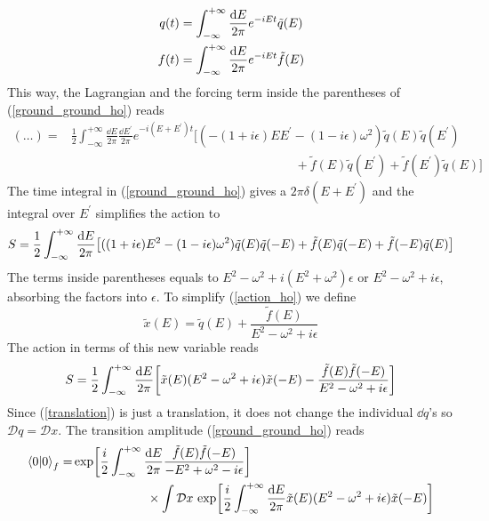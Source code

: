 \begin{equation}
    \begin{aligned}
           q(t)&=\int_{-\infty}^{+\infty}\frac{\dd E}{2\pi}e^{-iEt}\Tilde{q}(E)\\
           f(t)&=\int_{-\infty}^{+\infty}\frac{\dd E}{2\pi}e^{-iEt}\Tilde{f}(E)
    \end{aligned}
\end{equation}
This way, the Lagrangian and the forcing term inside the parentheses of (\ref{ground_ground_ho}) reads
\begin{align}
    (\dots)=&\frac{1}{2}\int_{-\infty}^{+\infty}\frac{\dd E}{2\pi}\frac{\dd E^{\prime}}{2\pi}e^{-i(E+E^{\prime})t}[(-(1+i\epsilon)EE^{\prime}-(1-i\epsilon)\omega^2)\tilde{q}(E)\tilde{q}(E^\prime)\nonumber\\
    &\qquad\qquad\qquad\qquad\qquad\qquad\qquad\qquad\qquad+\tilde{f}(E)\tilde{q}(E^\prime)+\tilde{f}(E^\prime)\tilde{q}(E)]
\end{align}
The time integral in (\ref{ground_ground_ho}) gives a $2\pi\delta(E+E^\prime)$ and the integral over $E^\prime$ simplifies the action to
\begin{equation}
    S=\frac{1}{2}\int_{-\infty}^{+\infty}\frac{\dd E}{2\pi}\qty[((1+i\epsilon)E^2-(1-i\epsilon)\omega^2)\tilde{q}(E)\tilde{q}(-E)+\tilde{f}(E)\tilde{q}(-E)+\tilde{f}(-E)\tilde{q}(E)]
    \label{action_ho}
\end{equation}
The terms inside parentheses equals to $E^2-\omega^2+i(E^2+\omega^2)\epsilon$ or $E^2-\omega^2+i\epsilon$, absorbing the factors into $\epsilon$. To simplify (\ref{action_ho}) we define
\begin{equation}
    \tilde{x}(E)=\tilde{q}(E)+\frac{\tilde{f}(E)}{E^2-\omega^2+i\epsilon}
    \label{translation}
\end{equation}
The action in terms of this new variable reads
\begin{equation}
    S=\frac{1}{2}\int_{-\infty}^{+\infty}\frac{\dd E}{2\pi}\qty[\tilde{x}(E)(E^2-\omega^2+i\epsilon)\tilde{x}(-E)-\frac{\tilde{f}(E)\tilde{f}(-E)}{E^2-\omega^2+i\epsilon}]
\end{equation}
Since (\ref{translation}) is just a translation, it does not change the individual $\dd q$'s so $\mathcal{D}q=\mathcal{D}x$. The transition amplitude (\ref{ground_ground_ho}) reads
\begin{equation}
\begin{aligned}
    \braket{0}_f=&\exp[\frac{i}{2}\int_{-\infty}^{+\infty}\frac{\dd E}{2\pi}\frac{\tilde{f}(E)\tilde{f}(-E)}{-E^2+\omega^2-i\epsilon}]\\&\qquad\qquad\qquad\times\int\mathcal{D}x\,\exp[\frac{i}{2}\int_{-\infty}^{+\infty}\frac{\dd E}{2\pi}\tilde{x}(E)(E^2-\omega^2+i\epsilon)\tilde{x}(-E)]
    \label{00_f_ho}
\end{aligned}
\end{equation}

